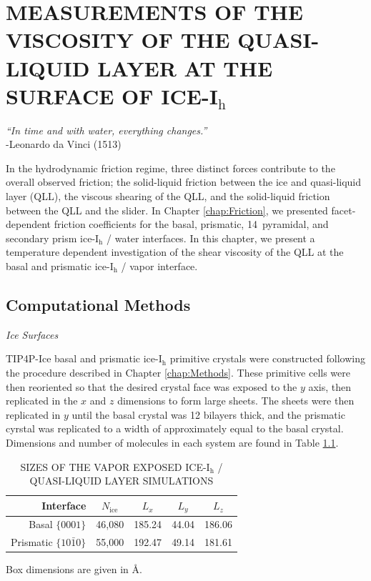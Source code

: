 \chapter{MEASUREMENTS OF THE VISCOSITY OF THE QUASI-LIQUID LAYER AT THE SURFACE OF ICE-I$_\mathrm{h}$}\label{chap:QLL}

\begin{flushright}
\textit{``In time and with water, everything changes.''} \\
-Leonardo da Vinci (1513) \\
\end{flushright}

In the hydrodynamic friction regime, three distinct forces contribute
to the overall observed friction; the solid-liquid friction between
the ice and quasi-liquid layer (QLL), the viscous shearing of the QLL,
and the solid-liquid friction between the QLL and the
slider.\cite{Kietzig2009,Kietzig2010} In Chapter \ref{chap:Friction},
we presented facet-dependent friction coefficients for the basal,
prismatic, 14\degree~pyramidal, and secondary prism ice-I$_\mathrm{h}$
/ water interfaces. In this chapter, we present a temperature
dependent investigation of the shear viscosity of the QLL at the basal
and prismatic ice-I$_\mathrm{h}$ / vapor interface.



\section{Computational Methods}

\begin{flushleft}
\textit{Ice Surfaces}
\end{flushleft}

TIP4P-Ice basal and prismatic ice-I$_\mathrm{h}$ primitive crystals
were constructed following the procedure described in Chapter
\ref{chap:Methods}. These primitive cells were then reoriented so that
the desired crystal face was exposed to the $y$ axis, then replicated
in the $x$ and $z$ dimensions to form large sheets. The sheets were
then replicated in $y$ until the basal crystal was 12 bilayers thick,
and the prismatic cyrstal was replicated to a width of approximately
equal to the basal crystal. Dimensions and number of molecules in each
system are found in Table \ref{tab:qll-method}.


\begin{table}[h]
\centering
\caption{SIZES OF THE VAPOR EXPOSED ICE-I$_\mathrm{h}$ / QUASI-LIQUID LAYER SIMULATIONS\label{tab:qll-method}}
\begin{tabular}{r|c|ccc}
\hline
\hline
 Interface & $N_\mathrm{ice}$ & $L_x$ & $L_y$ & $L_z$ \\
\hline
Basal  $\{0001\}$                           & 46,080 & 185.24 & 44.04 & 186.06 \\
Prismatic  $\{10\bar{1}0\}$            & 55,000 & 192.47 & 49.14 & 181.61\\
\hline
\hline
\end{tabular}
\begin{flushleft}
Box dimensions are given in \AA.
\end{flushleft}
\end{table}


